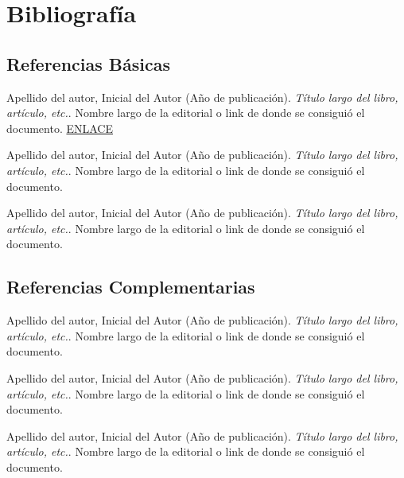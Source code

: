 \section{Bibliografía}

\subsection*{Referencias Básicas}

\hangindent=1in
Apellido del autor, Inicial del Autor (Año de publicación). \textit{Título largo del libro, artículo, etc.}. Nombre largo de la editorial o link de donde se consiguió el documento. \hyperlink{TEXTO}{ENLACE}

\hangindent=1in
Apellido del autor, Inicial del Autor (Año de publicación). \textit{Título largo del libro, artículo, etc.}. Nombre largo de la editorial o link de donde se consiguió el documento.

\hangindent=1in
Apellido del autor, Inicial del Autor (Año de publicación). \textit{Título largo del libro, artículo, etc.}. Nombre largo de la editorial o link de donde se consiguió el documento.

\subsection*{Referencias Complementarias}

\hangindent=1in
Apellido del autor, Inicial del Autor (Año de publicación). \textit{Título largo del libro, artículo, etc.}. Nombre largo de la editorial o link de donde se consiguió el documento.

\hangindent=1in
Apellido del autor, Inicial del Autor (Año de publicación). \textit{Título largo del libro, artículo, etc.}. Nombre largo de la editorial o link de donde se consiguió el documento.

\hangindent=1in
Apellido del autor, Inicial del Autor (Año de publicación). \textit{Título largo del libro, artículo, etc.}. Nombre largo de la editorial o link de donde se consiguió el documento.
\pagebreak